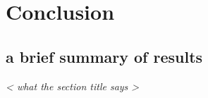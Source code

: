 \chapter{Conclusion}
\section{a brief summary of results}
\emph{ < what the section title says > }

